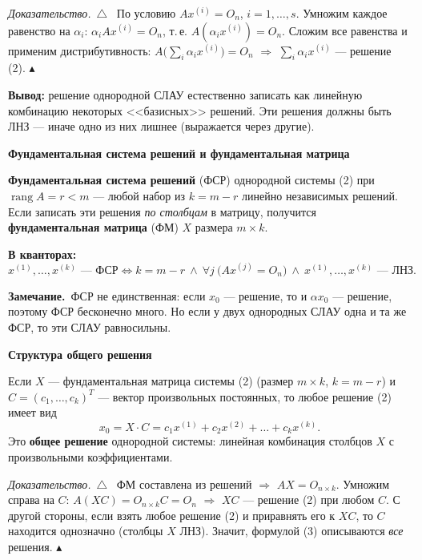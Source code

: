 \documentclass[a4paper,11pt]{article}
\DeclareMathOperator{\rang}{rang}
\newcommand{\kv}{\par\noindent\textbf{\textcolor{oprc!85!black}{В кванторах:}}}
\newcommand{\zam}{\par\smallskip\noindent\textbf{\textcolor{zamc}{Замечание.}}\ }
\newenvironment{dok}
  {\par\smallskip\noindent\textit{Доказательство.}\ $\triangle$\ \ignorespaces}
  {\unskip\nobreak\hfill$\blacktriangle$\par\smallskip}
\newcommand{\podr}[1]{\par\needspace{8\baselineskip}\medskip
  {\large\bfseries\textcolor{oprc!80!black}{#1}}\par\nopagebreak\smallskip}
\begin{document}
\begin{dok}
По условию $A x^{(i)} = O_n$, $i = 1, \dots, s$. Умножим каждое равенство на $\alpha_i$: $\alpha_i A x^{(i)} = O_n$, т.\,е.
$A(\alpha_i x^{(i)}) = O_n$. Сложим все равенства и применим дистрибутивность:
$A\bigl(\sum_i \alpha_i x^{(i)}\bigr) = O_n$ $\Rightarrow$ $\sum_i \alpha_i x^{(i)}$ --- решение (2).
\end{dok}

\textbf{Вывод:} решение однородной СЛАУ естественно записать как линейную комбинацию некоторых <<базисных>> решений.
Эти решения должны быть ЛНЗ --- иначе одно из них лишнее (выражается через другие).

\podr{Фундаментальная система решений и фундаментальная матрица}

\begin{opr}
\textbf{Фундаментальная система решений} (ФСР) однородной системы (2) при $\rang A = r < m$ --- любой набор
из $k = m - r$ линейно независимых решений. Если записать эти решения \emph{по столбцам} в матрицу, получится
\textbf{фундаментальная матрица} (ФМ) $X$ размера $m \times k$.
\kv
\[
  x^{(1)}, \dots, x^{(k)} \text{ --- ФСР} \Leftrightarrow k = m - r \ \wedge\ \forall j\ \bigl(A x^{(j)} = O_n\bigr) \ \wedge\ x^{(1)}, \dots, x^{(k)} \text{ --- ЛНЗ}.
\]
\end{opr}

\zam ФСР не единственная: если $x_0$ --- решение, то и $\alpha x_0$ --- решение, поэтому ФСР бесконечно много.
Но если у двух однородных СЛАУ одна и та же ФСР, то эти СЛАУ равносильны.

\podr{Структура общего решения}

\begin{teo}[3]
Если $X$ --- фундаментальная матрица системы (2) (размер $m \times k$, $k = m - r$) и $C = (c_1, \dots, c_k)^T$ ---
вектор произвольных постоянных, то любое решение (2) имеет вид
\[
  x_0 = X \cdot C = c_1 x^{(1)} + c_2 x^{(2)} + \dots + c_k x^{(k)}. \tag{3}
\]
Это \textbf{общее решение} однородной системы: линейная комбинация столбцов $X$ с произвольными коэффициентами.
\end{teo}

\begin{dok}
ФМ составлена из решений $\Rightarrow$ $AX = O_{n \times k}$. Умножим справа на $C$: $A(XC) = O_{n \times k} C = O_n$
$\Rightarrow$ $XC$ --- решение (2) при любом $C$. С другой стороны, если взять любое решение (2) и приравнять его к $XC$,
то $C$ находится однозначно (столбцы $X$ ЛНЗ). Значит, формулой (3) описываются \emph{все} решения.
\end{dok}
\end{document}
